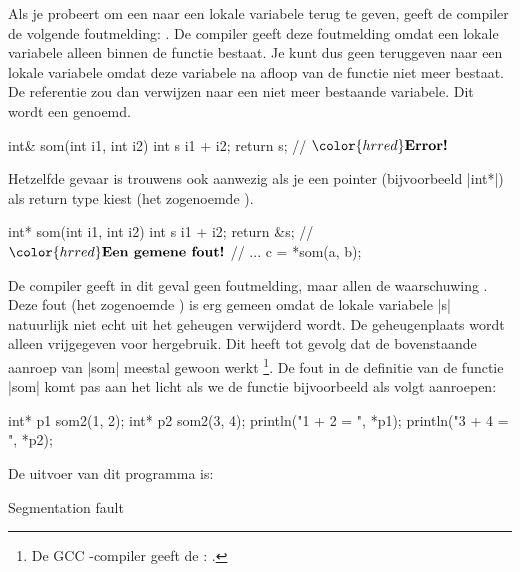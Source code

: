 \begin{cpplstShortInline}
Als je probeert om een  naar een lokale variabele terug te geven, 
geeft de compiler de volgende foutmelding: .
De compiler geeft deze foutmelding omdat een lokale variabele alleen binnen de functie bestaat. 
Je kunt dus geen  teruggeven naar een lokale variabele omdat deze variabele na afloop van de functie niet meer bestaat.
De referentie zou dan verwijzen naar een niet meer bestaande variabele.
Dit wordt een \emph{} genoemd.
\begin{cpplstfragment}[mathescape=true]
int& som(int i1, int i2) {
    int s {i1 + i2};
    return s; // $\color{hrred}\textbf{Error!}$
}
\end{cpplstfragment}

Hetzelfde gevaar is trouwens ook aanwezig als je een pointer (bijvoorbeeld |int*|) als return type kiest (het zogenoemde \emph{}). 
\begin{cpplstfragment}[mathescape=true]
int* som(int i1, int i2) {
    int s {i1 + i2};
    return &s; // $\color{hrred}\textbf{Een gemene fout!}$
}
//  ...
    c = *som(a, b);
\end{cpplstfragment}

De compiler geeft in dit geval geen foutmelding, maar allen de waarschuwing .
Deze fout (het zogenoemde \label{dangling reference}\emph{}) is erg gemeen omdat de lokale variabele |s| natuurlijk niet echt uit het geheugen verwijderd wordt. 
De geheugenplaats wordt alleen vrijgegeven voor hergebruik. 
Dit heeft tot gevolg dat de bovenstaande aanroep van |som| meestal gewoon werkt%
\footnote{%
    De GCC \Cpp{}\hyp{}compiler geeft de : .
}.
De fout in de definitie van de functie |som| komt pas aan het licht als we de functie bijvoorbeeld als volgt aanroepen:

\begin{cpplstfragment}
    int* p1 {som2(1, 2)};
    int* p2 {som2(3, 4)};
    println("1 + 2 = {}", *p1);
    println("3 + 4 = {}", *p2);
\end{cpplstfragment}

De uitvoer van dit programma is:
\begin{coutput}
Segmentation fault
\end{coutput}


\end{cpplstShortInline}
